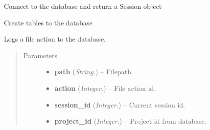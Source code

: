 \documentclass[letterpaper,10pt,english]{sphinxmanual}
\begin{document}
\begin{fulllineitems}
\label{api:controller.ConnectToDatabase}
Connect to the database and return a Session object

\end{fulllineitems}


\begin{fulllineitems}
\label{api:controller.CreateAll}
Create tables to the database

\end{fulllineitems}


\begin{fulllineitems}
\label{api:controller.CreateFileaction}
Logs a file action to the database.
\begin{quote}\begin{description}
\item[{Parameters}] \leavevmode\begin{itemize}
\item {} 
\textbf{path} (\emph{String.}) -- Filepath.

\item {} 
\textbf{action} (\emph{Integer.}) -- File action id.

\item {} 
\textbf{session\_id} (\emph{Integer.}) -- Current session id.

\item {} 
\textbf{project\_id} (\emph{Integer.}) -- Project id from database.

\end{itemize}

\end{description}\end{quote}

\end{fulllineitems}

\end{document}
